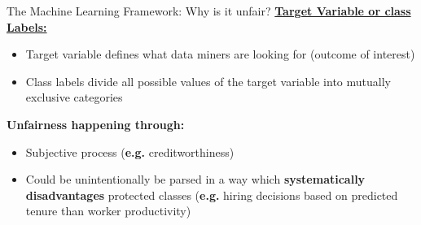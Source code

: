 
         
    

\begin{frame}{The Machine Learning Framework: Why is it unfair? \cite{Barocas.2016, barocas-hardt-narayanan}}
    \underline{\textbf{Target Variable or class Labels:}} \\
    \begin{itemize}
        \item Target variable defines what data miners are looking for (outcome of interest)
        \item Class labels divide all possible values of the target variable into mutually exclusive categories
    \end{itemize}

    \begin{block}{\textbf{Unfairness happening through:}}
    \begin{itemize}
        \item Subjective process (\textbf{e.g.} creditworthiness)
        \item Could be unintentionally be parsed in a way which \textbf{systematically disadvantages} protected classes (\textbf{e.g.} hiring decisions based on predicted tenure than worker productivity)
    \end{itemize}
        \end{block}
\end{frame}

